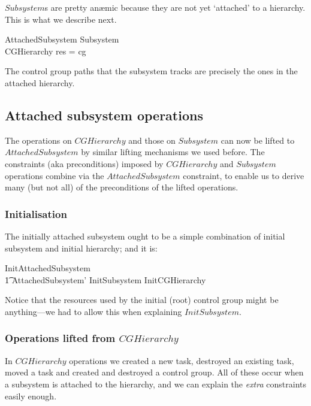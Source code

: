 \documentclass[a4paper,twoside,12pt]{article}
\begin{document}
$Subsystem$s are pretty an\ae{}mic because they are not yet `attached' to a hierarchy. This is what we describe next.

\begin{schema}{AttachedSubsystem}
Subsystem \\
CGHierarchy
\where
\dom res = \dom cg
\end{schema}
The control group paths that the subsystem tracks are precisely the ones in
the attached hierarchy.

\subsection{Attached subsystem operations}
The operations on $CGHierarchy$ and those on $Subsystem$ can now be lifted to $AttachedSubsystem$
by similar lifting mechanisms we used before. The constraints (aka preconditions) imposed
by $CGHierarchy$ and $Subsystem$ operations combine via the
$AttachedSubsystem$ constraint, to enable us to derive many (but not all) of the preconditions of the lifted operations.

\subsubsection{Initialisation}

The initially attached subsystem ought to be a simple combination of initial subsystem and initial hierarchy; and it is:

\begin{zed}
InitAttachedSubsystem  \\
\t1 AttachedSubsystem' \land InitSubsystem \land InitCGHierarchy
\end{zed}
Notice that the resources used by the initial (root) control group might be anything---we had to allow this when
explaining $InitSubsystem$.

\subsubsection{Operations lifted from $CGHierarchy$}

In $CGHierarchy$ operations we created a new task, destroyed an existing task, moved a task and created and destroyed
a control group.  All of these occur when a subsystem is attached to the hierarchy, and we can explain the \emph{extra}
constraints easily enough.
\end{document}
